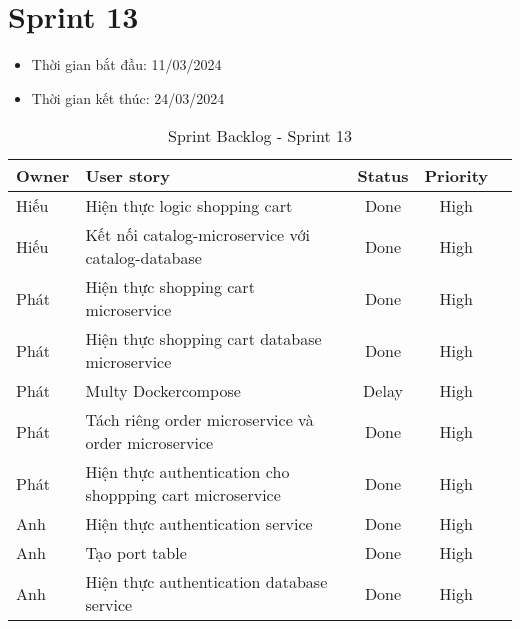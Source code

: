 \section{Sprint 13}
\begin{itemize}
    \item Thời gian bắt đầu: 11/03/2024
    \item Thời gian kết thúc: 24/03/2024
\end{itemize}
\begin{table}[H]
    \begin{tabular}{|m{2.5cm}|m{9cm}|c|c|c|}
    \hline
    \textbf{Owner}  & \textbf{User story}                                & \textbf{Status}  & \textbf{Priority} \\ \hline
    Hiếu                & Hiện thực logic shopping cart                    & Done                              & High         \\ \hline
    Hiếu               & Kết nối catalog-microservice với catalog-database                    & Done                              & High         \\ \hline
    Phát                & Hiện thực shopping cart microservice                   & Done                              & High         \\ \hline
    Phát               & Hiện thực shopping cart database microservice                     & Done                              & High         \\ \hline
    Phát               & Multy Dockercompose                     & Delay                             & High         \\ \hline
    Phát               & Tách riêng order microservice và order microservice                    & Done                              & High         \\ \hline
    Phát               & Hiện thực authentication cho shoppping cart microservice                     & Done                              & High         \\ \hline
    Anh               & Hiện thực authentication service                     & Done                              & High         \\ \hline
    Anh               & Tạo port table                     & Done                              & High         \\ \hline
    Anh               & Hiện thực authentication database service                    & Done                              & High         \\ \hline
    \end{tabular}
    \caption{Sprint Backlog - Sprint 13}
    \label{tab:sprint-13}
\end{table}

